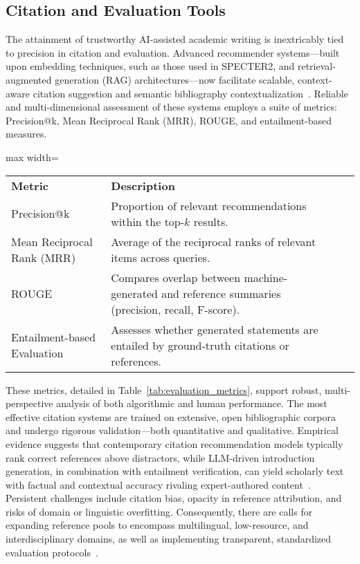 \documentclass[sigconf]{acmart}
\begin{document}
\subsection{Citation and Evaluation Tools}

The attainment of trustworthy AI-assisted academic writing is inextricably tied to precision in citation and evaluation. Advanced recommender systems—built upon embedding techniques, such as those used in SPECTER2, and retrieval-augmented generation (RAG) architectures—now facilitate scalable, context-aware citation suggestion and semantic bibliography contextualization~\cite{ref107}. Reliable and multi-dimensional assessment of these systems employs a suite of metrics: Precision@k, Mean Reciprocal Rank (MRR), ROUGE, and entailment-based measures.

\begin{table*}[htbp]
\centering
\caption{Key Evaluation Metrics for Citation Recommendation and Scholarly Text Generation}
\label{tab:evaluation_metrics}
\begin{adjustbox}{max width=\textwidth}
\begin{tabular}{@{}llll@{}}
\toprule
\textbf{Metric} & \textbf{Description} & & \\
Precision@k & Proportion of relevant recommendations within the top-$k$ results. & & \\
Mean Reciprocal Rank (MRR) & Average of the reciprocal ranks of relevant items across queries. & & \\
ROUGE & Compares overlap between machine-generated and reference summaries (precision, recall, F-score). & & \\
Entailment-based Evaluation & Assesses whether generated statements are entailed by ground-truth citations or references. & & \\
\bottomrule
\end{tabular}
\end{adjustbox}
\end{table*}

These metrics, detailed in Table~\ref{tab:evaluation_metrics}, support robust, multi-perspective analysis of both algorithmic and human performance. The most effective citation systems are trained on extensive, open bibliographic corpora and undergo rigorous validation—both quantitative and qualitative. Empirical evidence suggests that contemporary citation recommendation models typically rank correct references above distractors, while LLM-driven introduction generation, in combination with entailment verification, can yield scholarly text with factual and contextual accuracy rivaling expert-authored content~\cite{ref107}. Persistent challenges include citation bias, opacity in reference attribution, and risks of domain or linguistic overfitting. Consequently, there are calls for expanding reference pools to encompass multilingual, low-resource, and interdisciplinary domains, as well as implementing transparent, standardized evaluation protocols~\cite{ref107}.
\end{document}
